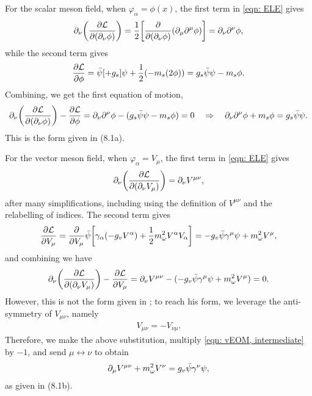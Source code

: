 For the scalar meson field, when $\varphi_\alpha = \phi(x)$, the first term in \eqref{eqn: ELE} gives
\begin{align*}
    \p_\nu \pqty{\pdv{\Lag}{(\p_\nu \phi)}} = \frac{1}{2} \bqty{\pdv{(\p_\nu \phi)}\pqty{\p_\mu \p^\mu \phi}} = \p_\nu \p^\nu \phi,
\end{align*}
while the second term gives
\begin{align*}
    \pdv{\Lag}{\phi} = \bar\psi[+g_s]\psi + \frac{1}{2}\pqty{-m_s(2\phi)} = g_s \bar\psi \psi - m_s\phi.
\end{align*}
Combining, we get the first equation of motion,
\begin{align}\label{eqn: eom,sm}
    \p_\nu \pqty{\pdv{\Lag}{(\p_\nu \phi)}} - \pdv{\Lag}{\phi} = \p_\nu \p^\nu \phi - (g_s\bar\psi \psi - m_s\phi) = 0 \goesto \p_\nu \p^\nu \phi + m_s \phi = g_s \bar\psi \psi.
\end{align}
This is the form given in \autocite{diener_2008} (8.1a).

For the vector meson field, when $\varphi_\alpha = V_\mu$, the first term in \eqref{eqn: ELE} gives
\begin{align*}
    \p_\nu \pqty{\pdv{\Lag}{(\p_\nu V_\mu)}} = \p_\nu V^{\mu\nu},
\end{align*}
after many simplifications, including using the definition of $V^{\mu\nu}$ and the relabelling of indices. The second term gives
\begin{align*}
    \pdv{\Lag}{V_\mu} = \pdv{}{V_\mu}\bar\psi\bqty{\gamma_\alpha(-g_v V^\alpha) + \frac{1}{2} m_\omega^2 V^\alpha V_\alpha} = -g_v \bar\psi \gamma^\mu \psi + m_\omega^2 V^\mu,
\end{align*}
and combining we have
\begin{align}\label{eqn: vEOM, intermediate}
    \p_\nu \pqty{\pdv{\Lag}{(\p_\nu V_\mu)}} - \pdv{\Lag}{V_\mu} = \p_\nu V^{\mu\nu} - (-g_v \bar\psi \gamma^\mu \psi + m_\omega^2 V^\mu) = 0.
\end{align}
However, this is not the form given in \autocite{diener_2008}; to reach his form, we leverage the anti-symmetry of $V_{\mu\nu}$, namely
\begin{align*}
    V_{\mu\nu} = - V_{\nu\mu}.
\end{align*}
Therefore, we make the above substitution, multiply \eqref{eqn: vEOM, intermediate} by $-1$, and send $\mu \leftrightarrow \nu$ to obtain
\begin{align}\label{eqn: eom,vm}
    \partial_\mu V^{\mu\nu} + m_\omega^2 V^\nu = g_v \bar\psi \gamma^\nu \psi,
\end{align}
as given in \cite{diener_2008} (8.1b).

